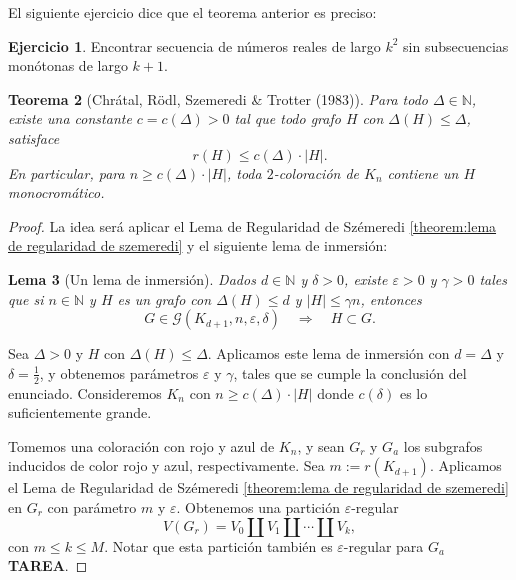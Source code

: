 \documentclass[12pt]{report}
\theoremstyle{plain}
\newtheorem{theorem}{Teorema}[section]
\newtheorem{lemma}[theorem]{Lema}
\theoremstyle{definition}
\newtheorem{exercise}[theorem]{Ejercicio}
\newcommand{\red}[1]{\textcolor{BrickRed}{#1}}
\newcommand{\naturals}{\mathbb{N}}
\newcommand{\abs}[1]{\left \vert #1 \right \vert}
\begin{document}
El siguiente ejercicio dice que el teorema anterior es preciso:
\begin{exercise}
Encontrar secuencia de números reales de largo $k^2$ sin subsecuencias monótonas de largo $k+1$.
\end{exercise}




\begin{theorem}[Chrátal, Rödl, Szemeredi \& Trotter (1983)]
Para todo $\Delta \in \naturals$, existe una constante $c = c(\Delta)>0$ tal que todo grafo $H$ con $\Delta (H) \leq \Delta$, satisface
\[
    r(H) \leq c(\Delta) \cdot \abs H.
\]
En particular, para $n \geq c(\Delta) \cdot \abs H$, toda $2$-coloración de $K_n$ contiene un $H$ monocromático.
\end{theorem}

\begin{proof}
La idea será aplicar el Lema de Regularidad de Szémeredi \ref{theorem:lema de regularidad de szemeredi} y el siguiente lema de inmersión:


\begin{lemma}[Un lema de inmersión]\label{lema:un lema de inmersion para numeros de ramsey}
Dados $d \in \naturals$ y $\delta >0$, existe $\varepsilon > 0$ y $\gamma > 0$ tales que si $n \in \naturals$ y $H$ es un grafo con $\Delta (H) \leq d$ y $\abs H \leq \gamma n$, entonces
\[
    G \in \mathcal G (K_{d+1}, n , \varepsilon , \delta) \quad \Longrightarrow \quad H \subset G    .
\]
\end{lemma}

Sea $\Delta > 0$ y $H$ con $\Delta (H) \leq \Delta$. Aplicamos este lema de inmersión con $d = \Delta$ y $\delta = \frac{1 }{2}$, y obtenemos parámetros $\varepsilon$ y $\gamma$, tales que se cumple la conclusión del enunciado. Consideremos $K_n$ con $n \geq c(\Delta) \cdot \abs H$ donde $c(\delta) $ es lo suficientemente grande.

Tomemos una coloración con rojo y azul de $K_n$, y sean $G_r$ y $G_a$ los subgrafos inducidos de color rojo y azul, respectivamente. Sea $m := r(K_{d+1})$. Aplicamos el Lema de Regularidad de Szémeredi \ref{theorem:lema de regularidad de szemeredi} en $G_r$ con parámetro $m$ y $\varepsilon$. Obtenemos una partición $\varepsilon$-regular
\[
    V(G_r) = V_0 \coprod V_1 \coprod \cdots \coprod V_k,
\]
con $m \leq k \leq M$. Notar que esta partición también es $\varepsilon$-regular para $G_a$ \red{\textbf{TAREA}}.


\end{proof}
\end{document}
